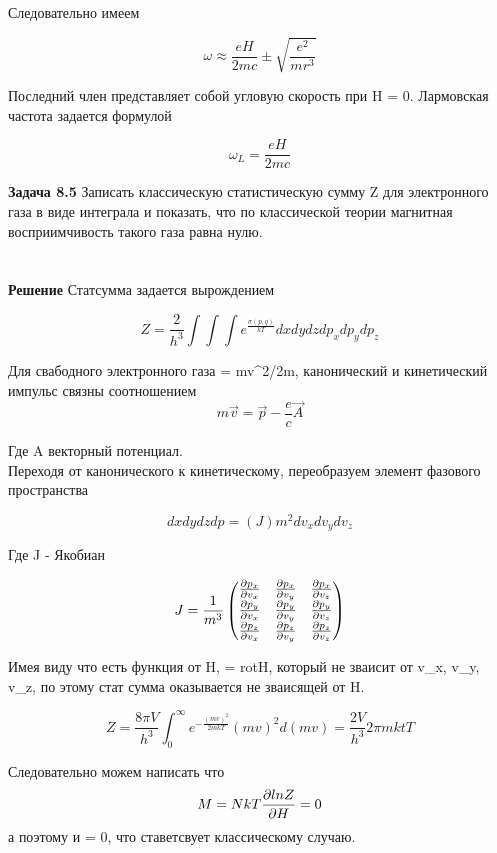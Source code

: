 \documentclass[a4paper,18pt]{article}
\begin{document}
Следовательно имеем 

\begin{equation}
    \omega \approx \frac{eH}{2mc} \pm \sqrt{\frac{e^2}{mr^3}}
\end{equation}

Последний член представляет собой угловую скорость при H = 0. Лармовская  частота задается формулой 

\begin{equation}
    \omega_L =  \frac{eH}{2mc}
\end{equation}


\textbf{Задача 8.5} Записать классическую статистическую сумму Z для электронного газа в виде интеграла и показать, что по классической теории магнитная восприимчивость такого газа равна нулю. \\ \\ \\  


\textbf{Решение} Статсумма задается вырождением 

\begin{equation}
    Z = \frac{2}{h^3}\int\int\int{e^{\frac{\sigma(p,q)}{kT}}dxdydzdp_xdp_ydp_z}
\end{equation}

Для свабодного электронного газа \sigma = mv^2/2m, канонический и кинетический импульс связны соотношением
\begin{equation}
    m\vec{v} = \vec{p} - \frac{e}{c}\vec{A}
\end{equation}

Где A векторный потенциал.\\ 
Переходя от канонического к кинетическому, переобразуем элемент фазового пространства

$${dxdydzdp = (J)m^2dv_xdv_ydv_z}$$

Где J - Якобиан

\begin{equation}
    J = \frac{1}{m^3}
    \begin{pmatrix}
        \pdv{p_x}{v_x} & \pdv{p_x}{v_y} & \pdv{p_x}{v_z} \\
        \pdv{p_y}{v_x} & \pdv{p_y}{v_y} & \pdv{p_y}{v_z} \\
        \pdv{p_z}{v_x} & \pdv{p_z}{v_y} & \pdv{p_z}{v_z}
    \end{pmatrix}

\end{equation}


Имея виду что  есть функция от H,  = rotH, который не зваисит от v_x, v_y, v_z, по этому стат сумма оказывается не зваисящей от H.

\begin{equation}
     Z = \frac{8\pi V}{h^3}\int^{\infty}_{0}{e^{-\frac{(mv)^2}{2mkT}}(mv)^2d(mv) = \frac{2V}{h^3}2\pi mktT}
\end{equation}

Следовательно можем написать что 
\begin{equation}
    M = NkT\pdv{lnZ}{H} = 0
\end{equation}
а поэтому и \kappa = 0, что ставетсвует классическому случаю.
\end{document}
